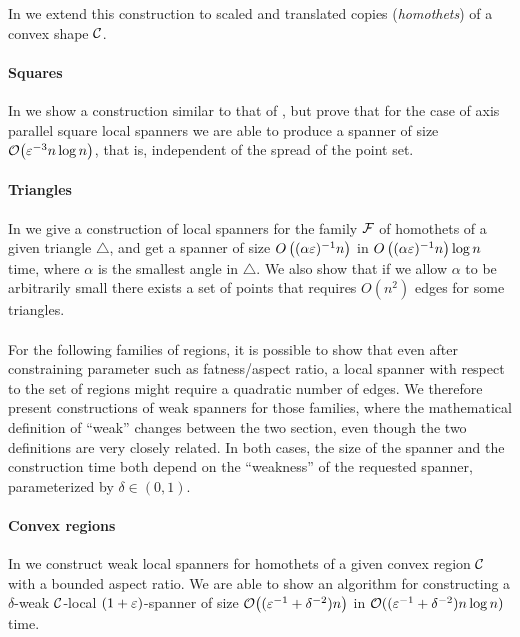\documentclass[12pt]{article}%
\begin{document}
In  we extend this construction to scaled and
translated copies (\emph{homothets}) of a convex shape $\mathcal{C}$.

\paragraph{Squares}
In  we show a construction similar to that of
, but prove that for the case of axis parallel square
local spanners we are able to produce a spanner of size
$\Of\pth{\eps^{-3} n \log n}$, that is, independent of the spread of
the point set.

\paragraph{Triangles}
In  we give a construction of local spanners for the
family $\mathcal{F}$ of homothets of a given triangle $\triangle$, and get a
spanner of size $O\left((\alpha\varepsilon)^{-1}n\right)$ in
$O\left((\alpha\varepsilon)^{-1}n\right)\log n$ time, where $\alpha$ is the
smallest angle in $\triangle$. We also show that if we allow $\alpha$
to be arbitrarily small there exists a set of points that requires
$O(n^2)$ edges for some triangles.

\paragraph{}
For the following families of regions, it is possible to show that
even after constraining parameter such as fatness/aspect ratio, a
local spanner with respect to the set of regions might require a
quadratic number of edges. We therefore present constructions of weak
spanners for those families, where the mathematical definition of
``weak'' changes between the two section, even though the two
definitions are very closely related. In both cases, the size of the
spanner and the construction time both depend on the ``weakness'' of
the requested spanner, parameterized by $\delta\in (0,1)$.

\paragraph{Convex regions}
In  we construct weak local spanners for
homothets of a given convex region $\mathcal{C}$ with a bounded aspect
ratio. We are able to show an algorithm for constructing a
$\delta$-weak $\mathcal{C}$-local $(1+\varepsilon)$-spanner of size
$\mathcal{O}\bigl( (\varepsilon^{-1} + \delta^{-2}) n \bigr) $ in
$\mathcal{O}( (\varepsilon^{-1} + \delta^{-2}) n \log n)$ time.
\end{document}
